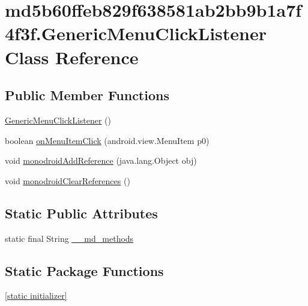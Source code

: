 \hypertarget{classmd5b60ffeb829f638581ab2bb9b1a7f4f3f_1_1_generic_menu_click_listener}{
\section{md5b60ffeb829f638581ab2bb9b1a7f4f3f.GenericMenuClickListener Class Reference}
\label{classmd5b60ffeb829f638581ab2bb9b1a7f4f3f_1_1_generic_menu_click_listener}
}
\subsection*{Public Member Functions}
\begin{CompactItemize}
\item 
\hyperlink{classmd5b60ffeb829f638581ab2bb9b1a7f4f3f_1_1_generic_menu_click_listener_d3240942327ae015893fa8e27045fe57}{GenericMenuClickListener} ()
\item 
boolean \hyperlink{classmd5b60ffeb829f638581ab2bb9b1a7f4f3f_1_1_generic_menu_click_listener_79412f7f13b9f7b52668e994eab1a66d}{onMenuItemClick} (android.view.MenuItem p0)
\item 
void \hyperlink{classmd5b60ffeb829f638581ab2bb9b1a7f4f3f_1_1_generic_menu_click_listener_789da55ae23929b66b71f9e9357ff250}{monodroidAddReference} (java.lang.Object obj)
\item 
void \hyperlink{classmd5b60ffeb829f638581ab2bb9b1a7f4f3f_1_1_generic_menu_click_listener_cd947cf5b70173321c638063cf1215d8}{monodroidClearReferences} ()
\end{CompactItemize}
\subsection*{Static Public Attributes}
\begin{CompactItemize}
\item 
static final String \hyperlink{classmd5b60ffeb829f638581ab2bb9b1a7f4f3f_1_1_generic_menu_click_listener_6c9c1226d60f05dc9be14f20174fdebb}{\_\-\_\-md\_\-methods}
\end{CompactItemize}
\subsection*{Static Package Functions}
\begin{CompactItemize}
\item 
\hyperlink{classmd5b60ffeb829f638581ab2bb9b1a7f4f3f_1_1_generic_menu_click_listener_c15c4d1ff298f8a945a0016cfe50848b}{\mbox{[}static initializer\mbox{]}}
\end{CompactItemize}
